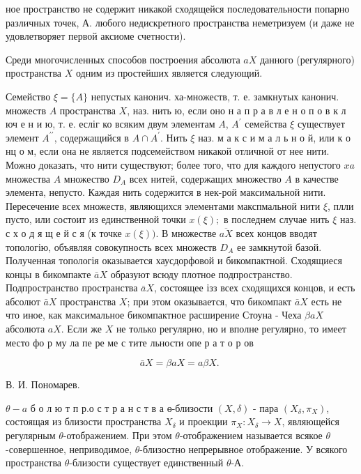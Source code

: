 \documentclass[10pt]{article}
\begin{document}
ное пространство не содержит никакой сходящейся последовательности попарно различных точек, А. любого недискретного пространства неметризуем (и даже не удовлетворяет первой аксиоме счетности).



Среди многочисленных способов построения абсолюта $a X$ данного (регулярного) пространства $X$ одним из простейших является следующий.



Семейство $\xi=\{A\}$ непустых канонич. ха-множеств, т. е. замкнутых канонич. множеств $A$ пространства $X$, наз. нить ю, если оно н а п р а в л е н о п о в к л юч е н и ю, т. е. есліг ко всяким двум элементам $A$, $A^{\prime}$ семейства $\xi$ существует элемент $A^{\prime \prime}$, содержащийся в $A \cap A^{\prime}$. Нить $\xi$ наз. м а к с и м а л ь н о й, или к о нц о м, если она не является подсемейством никакой отличной от нее нити. Можно доказать, что нити существуют; более того, что для каждого непустого $x a$ множества $A$ множество $D_{A}$ всех нитей, содержащих множество $A$ в качестве элемента, непусто. Каждая нить содержится в нек-рой максимальной нити. Пересечение всех множеств, являющихся элементами макспмальной нити $\xi$, плли пусто, или состоит из единственной точки $x(\xi) ;$ в последнем случае нить $\xi$ наз. с х о д я щ е й с я (к точке $x(\xi))$. В множестве $\overline{a X}$ всех концов вводят топологію, объявляя совокупность всех множеств $D_{A}$ ее замкнутой базой. Полученная топологія оказывается хаусдорфовой и бикомпактной. Сходящиеся концы в бикомпакте $\bar{a} X$ образуют всюду плотное подпространство. Подпространство пространства $\bar{a} X$, состоящее ізз всех сходящихся концов, и есть абсолют $\bar{a} X$ пространства $X$; при этом оказывается, что бикомпакт $\bar{a} X$ есть не что иное, как максимальное бикомпактное расширение Стоуна - Чеха $\beta a X$ абсолюта $a X$. Если же $X$ не только регулярно, но и вполне регулярно, то имеет место фо р му ла пе ре ме с тите льности опе р а т о р ов



\[

\bar{a} X=\beta a X=a \beta X \text {. }

\]



В. И. Пономарев.



$\theta-a$ б о л ю т п р.о с т р а н с т в а $ө$-близости $(X, \delta)$ - пара $\left(X_{\delta}, \pi_{X}\right)$, состоящая из близости пространства $X_{\delta}$ и проекции $\pi_{X}: X_{\delta} \rightarrow X$, являющейся регулярным $\theta$-отображением. При этом $\theta$-отображением называется всякое $\theta$-совершенное, неприводимое, $\theta$-близостно непрерывное отображение. У всякого пространства $\theta$-близости существует единственный $\theta$-А.
\end{document}
